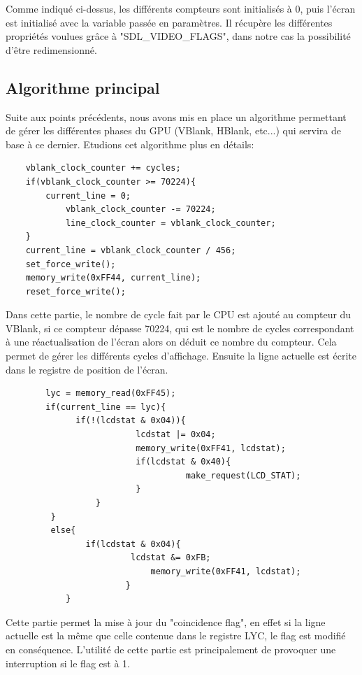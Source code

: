 \documentclass[french]{report}
\begin{document}
Comme indiqué ci-dessus, les différents compteurs sont initialisés à 0, puis l'écran est initialisé avec la variable passée en paramètres. Il récupère les différentes propriétés voulues grâce à "SDL\_VIDEO\_FLAGS", dans notre cas la possibilité d'être redimensionné.\\

\subsection{Algorithme principal}
	Suite aux points précédents, nous avons mis en place un algorithme permettant de gérer les différentes phases du GPU (VBlank, HBlank, etc...) qui servira de base à ce dernier. Etudions cet algorithme plus en détails:\\

\begin{lstlisting}
	vblank_clock_counter += cycles;
	if(vblank_clock_counter >= 70224){
		current_line = 0;
      		vblank_clock_counter -= 70224;
        	line_clock_counter = vblank_clock_counter;
	}
	current_line = vblank_clock_counter / 456;
	set_force_write();
	memory_write(0xFF44, current_line);
	reset_force_write();
\end{lstlisting}	

Dans cette partie, le nombre de cycle fait par le CPU est ajouté au compteur du VBlank, si ce compteur dépasse 70224, qui est le nombre de cycles correspondant à une réactualisation de l'écran alors on déduit ce nombre du compteur. Cela permet de gérer les différents cycles d'affichage. Ensuite la ligne actuelle est écrite dans le registre de position de l'écran.

\begin{lstlisting}                                        
     	lyc = memory_read(0xFF45);
        if(current_line == lyc){                        
          	  if(!(lcdstat & 0x04)){                  
                       	  lcdstat |= 0x04;
                          memory_write(0xFF41, lcdstat);
                          if(lcdstat & 0x40){
    	                            make_request(LCD_STAT);
                          }
                  }
         }
         else{
             	if(lcdstat & 0x04){
       		             lcdstat &= 0xFB;
                             memory_write(0xFF41, lcdstat);
                        }
         	}

\end{lstlisting}
Cette partie permet la mise à jour du "coincidence flag", en effet si la ligne actuelle est la même que celle contenue dans le registre LYC, le flag est modifié en conséquence. L'utilité de cette partie est principalement de provoquer une interruption si le flag est à 1.
\end{document}
